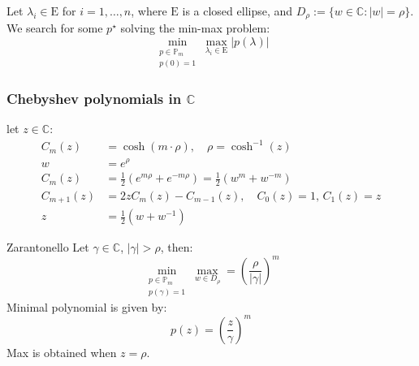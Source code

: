 
Let $\lambda_i \in \mathrm{E}$ for $i = 1, \ldots, n$, where $\mathrm{E}$ is a closed ellipse, and $D_\rho := \{w \in \mathbb{C} : |w| = \rho\}$.
We search for some $p^\star$ solving the min-max problem:
\[
    \min_{\substack{p \in \mathbb{P}_m \\ p(0) = 1}} \max_{\lambda_i \in \mathrm{E}} |p(\lambda)|
\]

\subsubsection{Chebyshev polynomials in $\mathbb{C}$}

let $z \in \mathbb{C}$:
\begin{align*}
    C_m(z)     & = \cosh(m \cdot \rho), \quad \rho = \cosh^{-1}(z)                 \\
    w          & = e^{\rho}                                                        \\
    C_m(z)     & = \frac{1}{2}(e^{m\rho} + e^{-m\rho}) = \frac{1}{2}(w^m + w^{-m}) \\
    C_{m+1}(z) & = 2zC_m(z) - C_{m-1}(z), \quad C_0(z) = 1, \, C_1(z) = z          \\
    z          & = \frac{1}{2}(w + w^{-1})
\end{align*}

\begin{lemma}{Zarantonello}{}
    Let $\gamma \in \mathbb{C}$, $|\gamma| > \rho$, then:
    \[
        \min_{\substack{p \in \mathbb{P}_m \\ p(\gamma) = 1}} \max_{w \in D_\rho} = \left(\frac{\rho}{|\gamma|}\right)^m
    \]
    Minimal polynomial is given by:
    \[
        p(z) = \left(\frac{z}{\gamma}\right)^m
    \]
    Max is obtained when $z = \rho$.
\end{lemma}

